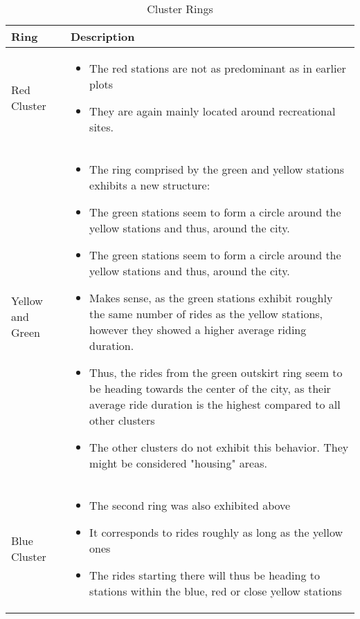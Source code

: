 \begin{table}[H]
\begin{tabular}{p{}p{}}
    \toprule
    \textbf{Ring} & \textbf{Description} \\
    \midrule
    Red Cluster & 
    \begin{itemize} 
        \item The red stations are not as predominant as in earlier plots 
        \item They are again mainly located around recreational sites. 
    \end{itemize}\\
    \hline
    Yellow and Green &   \begin{itemize}
        \item The ring comprised by the green and yellow stations exhibits a new structure:
        \item The green stations seem to form a circle around the yellow stations and thus, around the city. 
        \item The green stations seem to form a circle around the yellow stations and thus, around the city. 
        \item Makes sense, as the green stations exhibit roughly the same number of rides as the yellow stations, however they showed a higher average riding duration. 
        \item Thus, the rides from the green outskirt ring seem to be heading towards the center of the city, as their average ride duration is the highest compared to all other clusters
        \item The other clusters do not exhibit this behavior. They might be considered "housing" areas.
    \end{itemize}\\
    \hline
    Blue Cluster & 
    \begin{itemize}
        \item The second ring was also exhibited above
        \item It corresponds to rides roughly as long as the yellow ones
        \item The rides starting there will thus be heading to stations within the blue, red or close yellow stations
    \end{itemize}\\
    \bottomrule
\end{tabular}
\caption{\label{clusterRingsTable}Cluster Rings}
\end{table}
